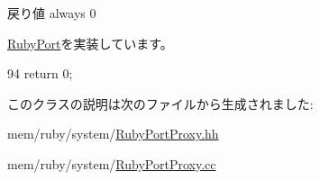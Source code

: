 \begin{DoxyReturn}{戻り値}
always 0 
\end{DoxyReturn}


\hyperlink{classRubyPort_a366b0b3d8b8a08b7066f1b98c1b40b85}{RubyPort}を実装しています。


\begin{DoxyCode}
94 { return 0; }
\end{DoxyCode}


このクラスの説明は次のファイルから生成されました:\begin{DoxyCompactItemize}
\item 
mem/ruby/system/\hyperlink{RubyPortProxy_8hh}{RubyPortProxy.hh}\item 
mem/ruby/system/\hyperlink{RubyPortProxy_8cc}{RubyPortProxy.cc}\end{DoxyCompactItemize}
